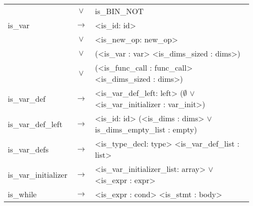 \documentclass[a4paper]{article}
\begin{document}
\begin{longtable}{lcl}
								& $\vee$ & is\_BIN\_NOT \\
	is\_var					 	& $\to$ & <is\_id: id> \\
								& $\vee$ & <is\_new\_op: new\_op> \\
								& $\vee$ & (<is\_var : var> <is\_dims\_sized : dims>) \\
								& $\vee$ & (<is\_func\_call : func\_call> <is\_dims\_sized : dims>) \\
	is\_var\_def			 	& $\to$ & <is\_var\_def\_left: left> ($\emptyset$ $\vee$ <is\_var\_initializer : var\_init>) \\
	is\_var\_def\_left		 	& $\to$ & <is\_id: id> (<is\_dims : dims> $\vee$ is\_dims\_empty\_list : empty) \\
	is\_var\_defs		 		& $\to$ & <is\_type\_decl: type> <is\_var\_def\_list : list> \\
	is\_var\_initializer 		& $\to$ & <is\_var\_initializer\_list: array> $\vee$ <is\_expr : expr> \\
	is\_while 					& $\to$ & <is\_expr : cond> <is\_stmt : body> \\
\end{longtable}
\end{document}
